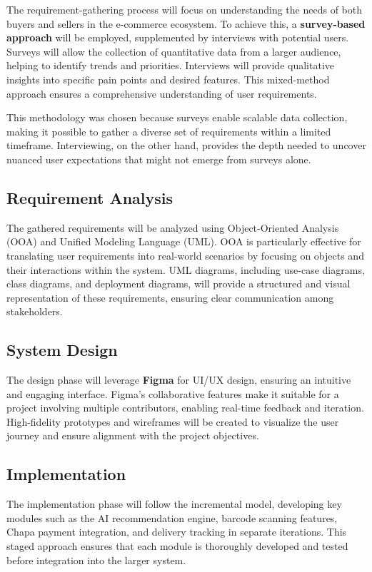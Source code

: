 \documentclass[12pt]{report}
\begin{document}
The requirement-gathering process will focus on understanding the needs of both buyers and
sellers in the e-commerce ecosystem. To achieve this, a \textbf{survey-based approach} will be
employed, supplemented by interviews with potential users. Surveys will allow the collection
of quantitative data from a larger audience, helping to identify trends and priorities.
Interviews will provide qualitative insights into specific pain points and desired features. This
mixed-method approach ensures a comprehensive understanding of user requirements.

This methodology was chosen because surveys enable scalable data collection, making it
possible to gather a diverse set of requirements within a limited timeframe\cite{c9}. Interviewing,
on the other hand, provides the depth needed to uncover nuanced user expectations that might
not emerge from surveys alone.

\subsection{Requirement Analysis}

The gathered requirements will be analyzed using Object-Oriented Analysis (OOA) and
Unified Modeling Language (UML). OOA is particularly effective for translating user
requirements into real-world scenarios by focusing on objects and their interactions within
the system\cite{c10}. UML diagrams, including use-case diagrams, class diagrams, and deployment
diagrams, will provide a structured and visual representation of these requirements, ensuring
clear communication among stakeholders.

\subsection{System Design}

The design phase will leverage \textbf{Figma} for UI/UX design, ensuring an intuitive and engaging
interface. Figma’s collaborative features make it suitable for a project involving multiple
contributors, enabling real-time feedback and iteration\cite{c11}. High-fidelity prototypes and
wireframes will be created to visualize the user journey and ensure alignment with the project
objectives.

\subsection{Implementation}

The implementation phase will follow the incremental model, developing key modules such
as the AI recommendation engine, barcode scanning features, Chapa payment integration,
and delivery tracking in separate iterations. This staged approach ensures that each module is
thoroughly developed and tested before integration into the larger system.
\end{document}
